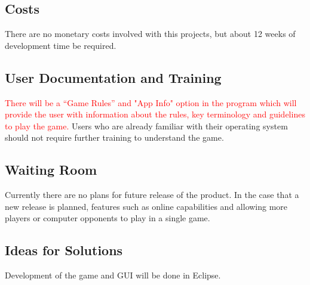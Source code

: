 \documentclass[12pt]{article}
\begin{document}
	\subsection{Costs}
	There are no monetary costs involved with this projects, but about 12 weeks of 				development time be required.
	\subsection{User Documentation and Training}
	\textcolor{red}{There will be a “Game Rules” and "App Info" option in the program which will provide the user with information about the rules, key terminology and guidelines to play 		the game.} Users who 	are already familiar with their operating system should not require further training to	understand the game. 
	\subsection{Waiting Room}
	Currently there are no plans for future release of the product. In the case that a new 		release is planned, features such as online capabilities and allowing more players or 		computer opponents to play in a single game. 
	\subsection{Ideas for Solutions}
	Development of the game and GUI will be done in Eclipse.
\end{document}
